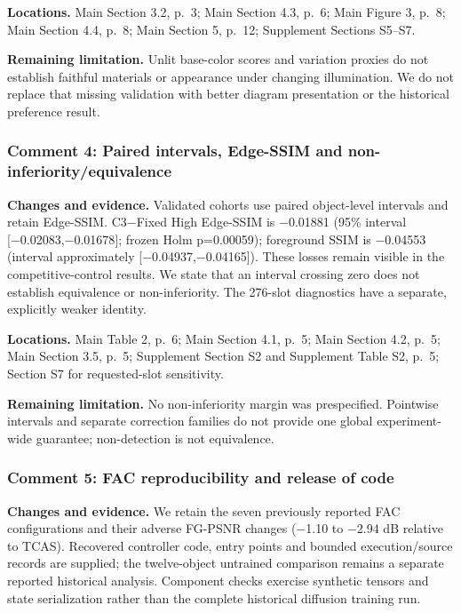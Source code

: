 \documentclass[
  10pt,
]{article}
\begin{document}
\textbf{Locations.} Main Section 3.2, p.~3; Main Section 4.3, p.~6; Main
Figure 3, p.~8; Main Section 4.4, p.~8; Main Section 5, p.~12;
Supplement Sections S5--S7.

\textbf{Remaining limitation.} Unlit base-color scores and variation
proxies do not establish faithful materials or appearance under changing
illumination. We do not replace that missing validation with better
diagram presentation or the historical preference result.

\hypertarget{comment-4-paired-intervals-edge-ssim-and-non-inferiorityequivalence}{%
\subsubsection{Comment 4: Paired intervals, Edge-SSIM and
non-inferiority/equivalence}\label{comment-4-paired-intervals-edge-ssim-and-non-inferiorityequivalence}}

\textbf{Changes and evidence.} Validated cohorts use paired object-level
intervals and retain Edge-SSIM. C3−Fixed High Edge-SSIM is −0.01881
(95\% interval {[}−0.02083,−0.01678{]}; frozen Holm p=0.00059);
foreground SSIM is −0.04553 (interval approximately
{[}−0.04937,−0.04165{]}). These losses remain visible in the
competitive-control results. We state that an interval crossing zero
does not establish equivalence or non-inferiority. The 276-slot
diagnostics have a separate, explicitly weaker identity.

\textbf{Locations.} Main Table 2, p.~6; Main Section 4.1, p.~5; Main
Section 4.2, p.~5; Main Section 3.5, p.~5; Supplement Section S2 and
Supplement Table S2, p.~5; Section S7 for requested-slot sensitivity.

\textbf{Remaining limitation.} No non-inferiority margin was
prespecified. Pointwise intervals and separate correction families do
not provide one global experiment-wide guarantee; non-detection is not
equivalence.

\hypertarget{comment-5-fac-reproducibility-and-release-of-code}{%
\subsubsection{Comment 5: FAC reproducibility and release of
code}\label{comment-5-fac-reproducibility-and-release-of-code}}

\textbf{Changes and evidence.} We retain the seven previously reported
FAC configurations and their adverse FG-PSNR changes (−1.10 to −2.94 dB
relative to TCAS). Recovered controller code, entry points and bounded
execution/source records are supplied; the twelve-object untrained
comparison remains a separate reported historical analysis. Component
checks exercise synthetic tensors and state serialization rather than
the complete historical diffusion training run.
\end{document}

